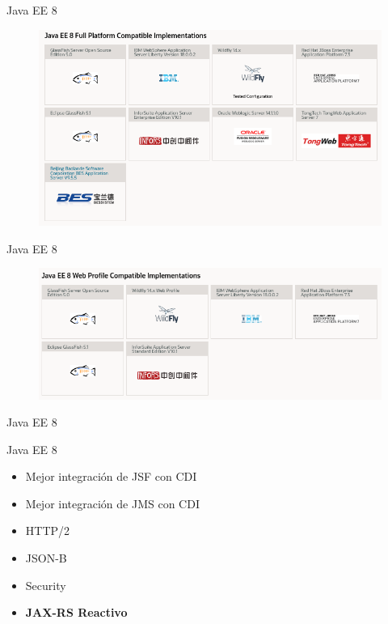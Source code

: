 \documentclass[aspectratio=169]{beamer}
\begin{document}
\begin{frame}{Java EE 8}
\begin{figure}
	\centering
	\includegraphics[width=\linewidth]{Images/ee8full}
\end{figure}
\end{frame}

\begin{frame}{Java EE 8}
\begin{figure}
	\centering
	\includegraphics[width=\linewidth]{Images/ee8web}
\end{figure}
\end{frame}

\begin{frame}{Java EE 8}
\begin{alertblock}{Java EE 8}
\begin{itemize}
	\item Mejor integración de JSF con CDI
	\item Mejor integración de JMS con CDI
	\item HTTP/2
	\item JSON-B
	\item Security
	\item \textbf{JAX-RS Reactivo}
\end{itemize}
\end{alertblock}
\end{frame}
\end{document}
